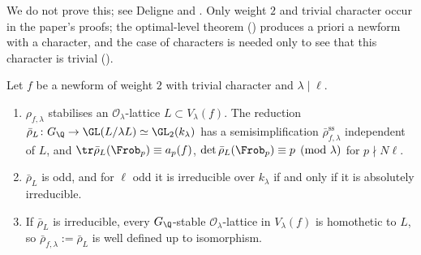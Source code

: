We do not prove this; see Deligne \cite{Deligne} and \cite[Chapter 9]{DiamondShurman}. Only weight $2$ and trivial character occur in the paper's
proofs; the optimal-level theorem () produces a priori a newform with a character, and the case of
characters is needed only to see that this character is trivial ().

\begin{proposition}\label{prop:modgalrep:lattices}
Let $f$ be a newform of weight $2$ with trivial character and $\lambda\mid\ell$.
\begin{enumerate}[label=(\roman*)]
\item $\rho_{f,\lambda}$ stabilises an $\mathcal{O}_\lambda$-lattice $L\subset V_\lambda(f)$. The reduction $\bar\rho_L\colon G_\Q\to\GL(L/\lambda L)\simeq\GL_2(k_\lambda)$ has a
semisimplification $\bar\rho_{f,\lambda}^{\mathrm{ss}}$ independent of $L$, and $\tr\bar\rho_L(\Frob_p)\equiv a_p(f)$, $\det\bar\rho_L(\Frob_p)\equiv p\pmod\lambda$ for $p\nmid N\ell$.
\item $\bar\rho_L$ is odd, and for $\ell$ odd it is irreducible over $k_\lambda$ if and only if it is absolutely irreducible.
\item If $\bar\rho_L$ is irreducible, every $G_\Q$-stable $\mathcal{O}_\lambda$-lattice in $V_\lambda(f)$ is homothetic to $L$, so $\bar\rho_{f,\lambda}:=\bar\rho_L$ is well defined
up to isomorphism.
\end{enumerate}
\end{proposition}

